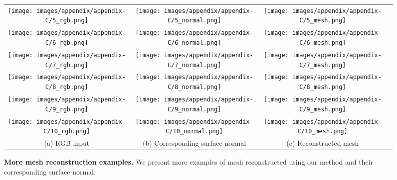 \begin{figure}
\centering
\begin{tabular}{@{}c@{\hspace{1mm}}c@{\hspace{1mm}}c@{\hspace{1mm}}c@{}}
\texttt{[image: images/appendix/appendix-C/5\_rgb.png]}  &
\texttt{[image: images/appendix/appendix-C/5\_normal.png]}  &
\texttt{[image: images/appendix/appendix-C/5\_mesh.png]} \\
\texttt{[image: images/appendix/appendix-C/6\_rgb.png]}  &
\texttt{[image: images/appendix/appendix-C/6\_normal.png]}  &
\texttt{[image: images/appendix/appendix-C/6\_mesh.png]} \\
\texttt{[image: images/appendix/appendix-C/7\_rgb.png]}  &
\texttt{[image: images/appendix/appendix-C/7\_normal.png]}  &
\texttt{[image: images/appendix/appendix-C/7\_mesh.png]} \\
\texttt{[image: images/appendix/appendix-C/8\_rgb.png]}  &
\texttt{[image: images/appendix/appendix-C/8\_normal.png]}  &
\texttt{[image: images/appendix/appendix-C/8\_mesh.png]} \\
\texttt{[image: images/appendix/appendix-C/9\_rgb.png]}  &
\texttt{[image: images/appendix/appendix-C/9\_normal.png]}  &
\texttt{[image: images/appendix/appendix-C/9\_mesh.png]} \\
\texttt{[image: images/appendix/appendix-C/10\_rgb.png]}  &
\texttt{[image: images/appendix/appendix-C/10\_normal.png]}  &
\texttt{[image: images/appendix/appendix-C/10\_mesh.png]} \\
\small (a) RGB input & \small(b) Corresponding surface normal & \small (c) Reconstructed mesh  \\
\end{tabular}
    \caption{\textbf{More mesh reconstruction examples.} We present more examples of mesh reconstructed using our method and their corresponding surface normal.}
    \label{fig:more_normal_comparison_more}
\end{figure}